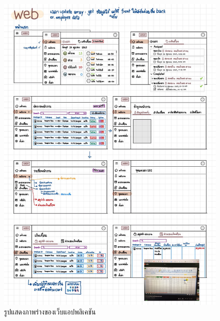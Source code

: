 \begin{figure}
  \begin{center}
    \includegraphics[width=14cm,keepaspectratio]{./images/design3.jpg}
  \end{center}
  \caption[รูปแสดงภาพร่างของเว็บแอปพลิเคชัน]{รูปแสดงภาพร่างของเว็บแอปพลิเคชัน} 
  
\end{figure}

